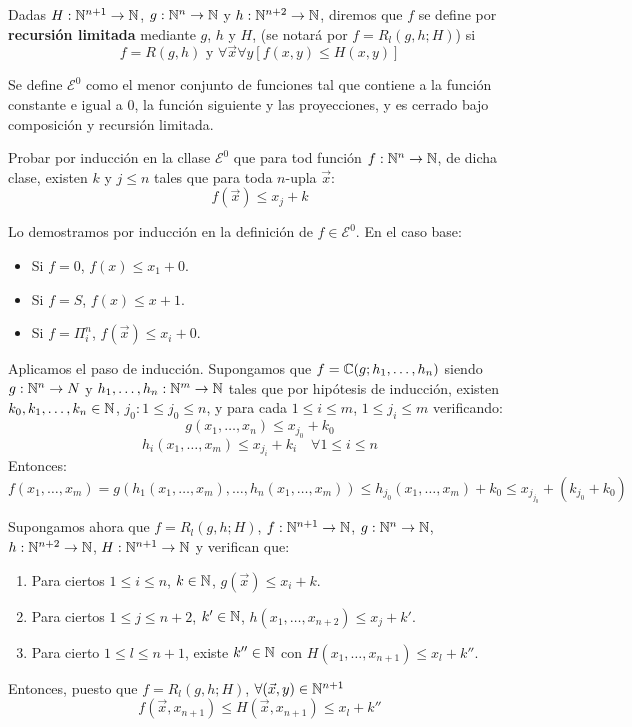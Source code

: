 \documentclass[twoside]{article}
\begin{document}
\newpage
\begin{ejercicio}{30}
Dadas $H : \mathbb{N}^{n+1} \to \mathbb{N}$, $g : \mathbb{N}^n \to \mathbb{N}$ y $h : \mathbb{N}^{n+2} \to \mathbb{N}$, diremos que $f$ se define por \textbf{recursión limitada} mediante $g$, $h$ y $H$, (se notará por $f = R_l(g,h;H)$) si
\[ f = R(g,h) \text{ y } \forall \vec{x} \forall y [f(x,y) ≤ H(x,y)] \]

Se define $\mathcal{E}^0$ como el menor conjunto de funciones tal que contiene a la función constante e igual a $0$, la función siguiente y las proyecciones, y es cerrado bajo composición y recursión limitada.

Probar por inducción en la cllase $\mathcal{E}^0$ que para tod función $f : \mathbb{N}^n \to \mathbb{N}$, de dicha clase, existen $k$ y $j ≤ n$ tales que para toda $n$-upla $\vec{x}$:
\[ f(\vec{x}) ≤ x_j + k \]
\end{ejercicio}
\begin{sol}
Lo demostramos por inducción en la definición de $f \in \mathcal{E}^0$. En el caso base:
\begin{itemize}
	\item Si $f = 0$, $f(x) ≤ x_1+0$.
	\item Si $f = S$, $f(x) ≤ x+1$.
	\item Si $f = Π_i^n$, $f(\vec{x}) ≤ x_i+0$.
\end{itemize}
Aplicamos el paso de inducción. Supongamos que $f = \mathbb{C}(g;h_1,\dots,h_n)$ siendo $g : \mathbb{N}^n \to N$ y $h_1,\dots,h_n : \mathbb{N}^m \to \mathbb{N}$ tales que por hipótesis de inducción, existen $k_0,k_1,\dots,k_n \in \mathbb{N}$, $j_0 : 1 ≤ j_0≤n$, y para cada $1≤i≤m$, $1≤j_i≤m$ verificando:
\[ g(x_1,\dots,x_n) ≤ x_{j_0}+k_0 \]
\[ h_i(x_1,\dots,x_m) ≤ x_{j_i} + k_i \quad \forall 1≤i≤n\]
Entonces:
\[ f(x_1,\dots,x_m) = g(h_1(x_1,\dots,x_m),\dots,h_n(x_1,\dots,x_m)) ≤ h_{j_0}(x_1,\dots,x_m) + k_0 ≤ x_{j_{j_0}} + (k_{j_0} + k_0) \]

Supongamos ahora que $f = R_l(g,h;H)$, $f : \mathbb{N}^{n+1} \to \mathbb{N}$, $g : \mathbb{N}^n \to \mathbb{N}$, $h : \mathbb{N}^{n+2} \to \mathbb{N}$, $H : \mathbb{N}^{n+1}\to\mathbb{N}$ y verifican que:
\begin{enumerate}
	\item Para ciertos $1≤i≤n$, $k \in \mathbb{N}$, $g(\vec{x})≤x_i+k$.
	\item Para ciertos $1≤j≤n+2$, $k' \in \mathbb{N}$, $h(x_1,\dots,x_{n+2})≤x_j+k'$.
	\item  Para cierto $1≤l≤n+1$, existe $k'' \in \mathbb{N}$ con $H(x_1,\dots,x_{n+1}) ≤ x_l + k''$.
\end{enumerate}
Entonces, puesto que $f = R_l(g,h;H)$, $\forall (\vec{x},y) \in \mathbb{N}^{n+1}$
\[ f(\vec{x},x_{n+1}) ≤ H(\vec{x},x_{n+1}) ≤ x_l + k'' \]
\end{sol}
\end{document}
